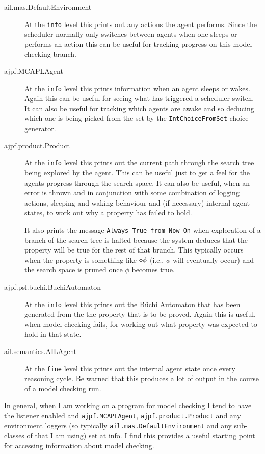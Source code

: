 \documentclass[a4]{article}
\begin{document}
\begin{description}
\item[ail.mas.DefaultEnvironment] At the \texttt{info} level this prints out any actions the agent performs.  Since the scheduler normally only switches between agents when one sleeps or performs an action this can be useful for tracking progress on this model checking branch.
\item[ajpf.MCAPLAgent] At the \texttt{info} level this prints information when an agent sleeps or wakes.  Again this can be useful for seeing what has triggered a scheduler switch.  It can also be useful for tracking which agents are awake and so deducing which one is being picked from the set by the \texttt{IntChoiceFromSet} choice generator.
\item[ajpf.product.Product] At the \texttt{info} level this prints out the current path through the search tree being explored by the agent.  This can be useful just to get a feel for the agents progress through the search space.  It can also be useful, when an error is thrown and in conjunction with some combination of logging actions, sleeping and waking behaviour and (if necessary) internal agent states, to work out why a property has failed to hold.

It also prints the message \texttt{Always True from Now On} when exploration of a branch of the search tree is halted because the system deduces that the property will be true for the rest of that branch.  This typically occurs when the property is something like $\diamond \phi$ (i.e., $\phi$ will eventually occur) and the search space is pruned once $\phi$ becomes true.
\item[ajpf.psl.buchi.BuchiAutomaton] At the \texttt{info} level this prints out the B\"{u}chi Automaton that has been generated from the the property that is to be proved.  Again this is useful, when model checking fails, for working out what property was expected to hold in that state.
\item[ail.semantics.AILAgent] At the \texttt{fine} level this prints out the internal agent state once every reasoning cycle.  Be warned that this produces a lot of output in the course of a model checking run.
\end{description}

In general, when I am working on a program for model checking I tend to have the  listener enabled and \texttt{ajpf.MCAPLAgent}, \texttt{ajpf.product.Product} and any environment loggers (so typically \texttt{ail.mas.DefaultEnvironment} and any sub-classes of that I am using) set at info.   I find this provides a useful starting point for accessing information about model checking.
\end{document}
